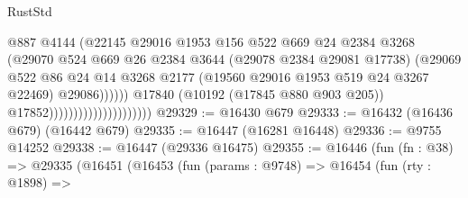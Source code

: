 \begin{lexlean}{RustStd}
\begin{coremodule}
                                                    @887
                                                    @4144
                                                    (@22145
                                                      @29016
                                                      @1953
                                                      @156
                                                      @522
                                                      @669
                                                      @24
                                                      @2384
                                                      @3268
                                                      (@29070
                                                        @524
                                                        @669
                                                        @26
                                                        @2384
                                                        @3644
                                                        (@29078 @2384 @29081 @17738)
                                                        (@29069
                                                          @522
                                                          @86
                                                          @24
                                                          @14
                                                          @3268
                                                          @2177
                                                          (@19560
                                                            @29016
                                                            @1953
                                                            @519
                                                            @24
                                                            @3267
                                                            @22469)
                                                          @29086))))))
                                              @17840
                                              (@10192 (@17845 @880 @903 @205))
                                              @17852)))))))))))))))))))))
@29329 := @16430 @679
@29333 := @16432 (@16436 @679) (@16442 @679)
@29335 := @16447 (@16281 @16448)
@29336 := @9755 @14252
@29338 := @16447 (@29336 @16475)
@29355 := @16446
    (fun (fn : @38) =>
    @29335
      (@16451
        (@16453
          (fun (params : @9748) =>
          @16454
            (fun (rty : @1898) =>

\end{coremodule}
\end{lexlean}
